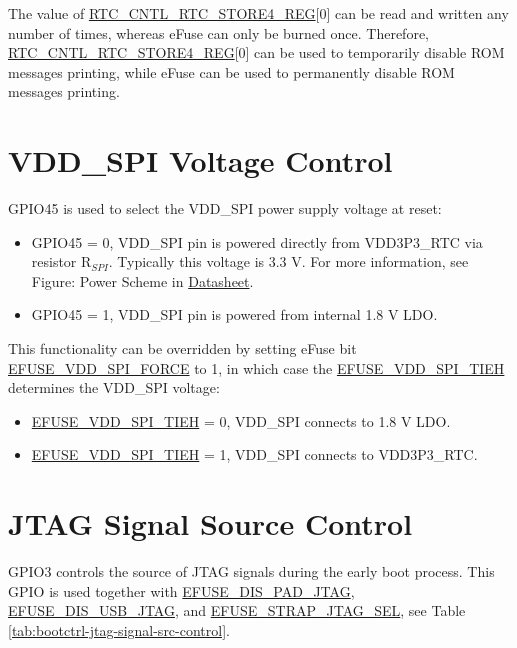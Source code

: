 \documentclass[main\_\_EN.tex]{subfiles}
\begin{document}
\vspace{-1em}
\begin{tiplisting}
The value of \hyperref[regdesc:RTCCNTLRTCSTORE4REG]{RTC\_CNTL\_RTC\_STORE4\_REG}[0] can be read and written any number of times, whereas eFuse can only be burned once. Therefore, \hyperref[regdesc:RTCCNTLRTCSTORE4REG]{RTC\_CNTL\_RTC\_STORE4\_REG}[0] can be used to temporarily disable ROM messages printing, while eFuse can be used to permanently disable ROM messages printing.
\end{tiplisting}

\section{VDD\_SPI Voltage Control}

GPIO45 is used to select the VDD\_SPI power supply voltage at reset:

\begin{itemize}
    \item GPIO45 = 0, VDD\_SPI pin is powered directly from VDD3P3\_RTC via resistor R$_{SPI}$. Typically this voltage is 3.3 V. For more information, see Figure: \chipname{} Power Scheme in \href{https://www.espressif.com/sites/default/files/documentation/esp32-s3_datasheet_en.pdf}{\chipname{} Datasheet}.
    \item GPIO45 = 1, VDD\_SPI pin is powered from internal 1.8 V LDO.
\end{itemize}

This functionality can be overridden by setting eFuse bit \hyperref[fielddesc:EFUSEVDDSPIFORCE]{EFUSE\_VDD\_SPI\_FORCE} to 1, in which case the \hyperref[fielddesc:EFUSEVDDSPITIEH]{EFUSE\_VDD\_SPI\_TIEH} determines the VDD\_SPI voltage:

\begin{itemize}
    \item \hyperref[fielddesc:EFUSEVDDSPITIEH]{EFUSE\_VDD\_SPI\_TIEH} = 0, VDD\_SPI connects to 1.8 V LDO.
    \item \hyperref[fielddesc:EFUSEVDDSPITIEH]{EFUSE\_VDD\_SPI\_TIEH} = 1, VDD\_SPI connects to VDD3P3\_RTC.
\end{itemize}

\section{JTAG Signal Source Control}

GPIO3 controls the source of JTAG signals during the early boot process. This GPIO is used together with \hyperref[fielddesc:EFUSEDISPADJTAG]{EFUSE\_DIS\_PAD\_JTAG}, \hyperref[fielddesc:EFUSEDISUSBJTAG]{EFUSE\_DIS\_USB\_JTAG}, and \hyperref[fielddesc:EFUSESTRAPJTAGSEL]{EFUSE\_STRAP\_JTAG\_SEL}, see Table \ref{tab:bootctrl-jtag-signal-src-control}.
\end{document}
